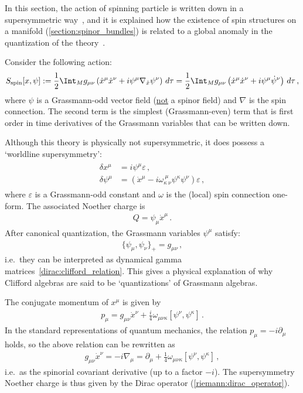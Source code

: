     In this section, the action of spinning particle is written down in a supersymmetric way~\citep{berezin_particle_1977}, and it is explained how the existence of spin structures on a manifold (\cref{section:spinor_bundles}) is related to a global anomaly in the quantization of the theory~\citep{witten_global_1985}.

    Consider the following action:
    \begin{gather}
        S_{\text{spin}}[x,\psi] := \frac{1}{2}\Int_Mg_{\mu\nu}\left(\dot{x}^\mu\dot{x}^\nu + i\psi^\mu\nabla_{\dot{x}}\psi^\nu\right)\,d\tau = \frac{1}{2}\Int_Mg_{\mu\nu}\left(\dot{x}^\mu\dot{x}^\nu + i\psi^\mu\dot{\psi}^\nu\right)\,d\tau\,,
    \end{gather}
    where $\psi$ is a Grassmann-odd vector field (\underline{not} a spinor field) and $\nabla$ is the spin connection. The second term is the simplest (Grassmann-even) term that is first order in time derivatives of the Grassmann variables that can be written down.

    Although this theory is physically not supersymmetric, it does possess a `worldline supersymmetry':
    \begin{gather}
        \begin{aligned}
            \delta x^\mu &= i\psi^\mu\varepsilon\,,\\
            \delta\psi^\mu &= \left(\dot{x}^\mu - i\omega^{\ \mu\ }_{\kappa\ \nu}\psi^\kappa\psi^\nu\right)\varepsilon\,,
        \end{aligned}
    \end{gather}
    where $\varepsilon$ is a Grassmann-odd constant and $\omega$ is the (local) spin connection one-form. The associated Noether charge is
    \begin{gather}
        Q = \psi_\mu\dot{x}^\mu\,.
    \end{gather}
    After canonical quantization, the Grassmann variables $\psi^\mu$ satisfy:
    \begin{gather}
        \{\psi_\mu,\psi_\nu\}_+ = g_{\mu\nu}\,,
    \end{gather}
    i.e.~they can be interpreted as dynamical gamma matrices~\eqref{dirac:clifford_relation}. This gives a physical explanation of why Clifford algebras are said to be `quantizations' of Grassmann algebras.

    The conjugate momentum of $x^\mu$ is given by
    \begin{gather}
        p_\mu = g_{\mu\nu}\dot{x}^\nu + \frac{i}{4}\omega_{\mu\nu\kappa}[\psi^\nu,\psi^\kappa]\,.
    \end{gather}
    In the standard representations of quantum mechanics, the relation $p_\mu = -i\partial_\mu$ holds, so the above relation can be rewritten as
    \begin{gather}
        g_{\mu\nu}\dot{x}^\nu = -i\nabla_\mu = \partial_\mu + \frac{1}{4}\omega_{\mu\nu\kappa}[\psi^\nu,\psi^\kappa]\,,
    \end{gather}
    i.e.~as the spinorial covariant derivative (up to a factor $-i$). The supersymmetry Noether charge is thus given by the Dirac operator (\cref{riemann:dirac_operator}).

